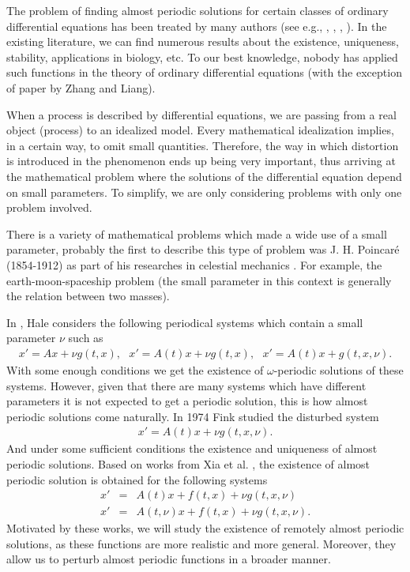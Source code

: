 \documentclass[english,reqno]{amsart}
\numberwithin{equation}{section}
\theoremstyle{plain}
\theoremstyle{definition}
\theoremstyle{remark}
\begin{document}
The problem of finding almost periodic solutions for certain classes of ordinary differential equations has been treated by many authors (see e.g., \cite{8r}, \cite{10r}, \cite{11r}, \cite{41r}). In the existing literature, we can find numerous results about the existence, uniqueness, stability, applications in biology, etc.  To our best knowledge, nobody has applied such functions in the theory of ordinary differential equations (with the exception of paper \cite{zhangremote1} by Zhang and Liang).

When a process is described by differential equations, we are passing from a real object (process) to an idealized model. Every mathematical idealization implies, in a certain way, to omit small quantities.
Therefore, the way in which distortion is introduced in the phenomenon ends up being very important, thus arriving at the mathematical problem where the solutions of the differential equation depend on small parameters. To simplify, we are only considering problems with only one problem involved.


There is a variety of mathematical problems which made a wide use of a small parameter, probably the first to describe this type of problem was J. H. Poincar\'e (1854-1912) as part of his researches in celestial mechanics \cite{poincare}. For example, the earth-moon-spaceship problem (the small parameter in this context is generally the relation between two masses).

In \cite{hale}, Hale considers the following periodical systems which contain a small parameter $\nu$ such as
\begin{eqnarray*}
x'=Ax+\nu g(t,x),\ \ \ x'=A(t)x+\nu g(t,x),\ \ \ x'=A(t)x+g(t,x,\nu).
\end{eqnarray*}
With some enough conditions we get the existence of $\omega$-periodic solutions of these systems. However, given that there are many systems which have different parameters it is not expected to get a periodic solution, this is how almost periodic solutions come naturally. In 1974 Fink \cite{fink} studied the disturbed system
\begin{eqnarray*}
x'=A(t)x+\nu g(t,x,\nu).
\end{eqnarray*}
And under some sufficient conditions the existence and uniqueness of almost periodic solutions. Based on works from Xia et al. \cite{xia}, the existence of almost periodic solution is obtained for the following systems
\begin{eqnarray*}
x'&=&A(t)x+f(t,x)+\nu g(t,x,\nu)\\
x'&=&A(t,\nu)x+f(t,x)+\nu g(t,x,\nu).
\end{eqnarray*}
Motivated by these works, we will study the existence of remotely almost periodic solutions, as these functions are more realistic and more general. Moreover, they allow us to perturb almost periodic functions in a broader manner.
\end{document}
